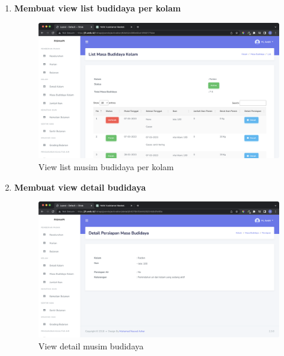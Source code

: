 \begin{enumerate}[1.]
\item \textbf{Membuat view list budidaya per kolam}
\begin{figure}[H]
	\centering
	\includegraphics[width=1\textwidth]{gambar/Sprint04/view/view_list_musim_budidaya_perkolam}
	\caption{View list musim budidaya per kolam}
	\label{fig:view_list_musim_budidaya_perkolam}
\end{figure}


\item \textbf{Membuat view detail budidaya}
\begin{figure}[H]
	\centering
	\includegraphics[width=1\textwidth]{gambar/Sprint04/view/view_detail_budidaya}
	\caption{View detail musim budidaya}
	\label{fig:view_detail_budidaya}
\end{figure}



\end{enumerate}